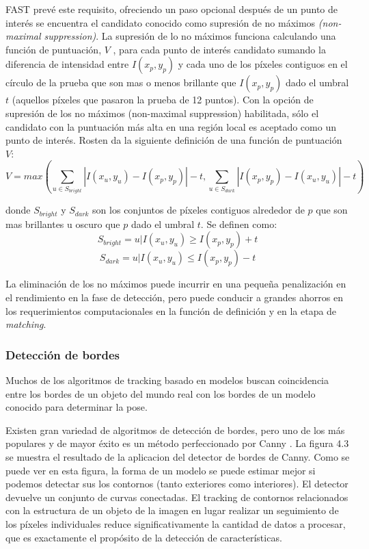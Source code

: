 FAST prevé este requisito, ofreciendo un paso opcional después de un punto de interés se encuentra el candidato conocido como supresión de no máximos \emph{(non-maximal suppression)}. La supresión de lo no máximos funciona calculando una función de puntuación, $V$ , para cada punto de interés candidato sumando la diferencia de intensidad entre $I(x_p,y_p)$ y cada uno de los píxeles contiguos en el círculo de la prueba que son mas o menos brillante que $I(x_p , y_p)$  dado el  umbral $t$  (aquellos píxeles que pasaron la prueba de 12 puntos). Con la opción de supresión de los no máximos (non-maximal suppression) habilitada, sólo el candidato con la puntuación más alta en una región local es aceptado como un punto de interés. Rosten \cite{Rosten} da la siguiente definición de una función de puntuación $V$:
\begin{equation}
  V = max\left( \displaystyle \sum_{u\in S_{bright}} \left | I(x_u,y_u) - I(x_p,y_p) \right | -t , \sum_{u\in S_{dark}} \left | I(x_p,y_p) - I(x_u,y_u) \right | -t \right) 
\end{equation}

donde $S_{bright}$ y $S_{dark}$ son los conjuntos de píxeles contiguos alrededor de $p$ que son mas brillantes u oscuro que $p$ dado el umbral $t$. Se definen como:
\begin{equation}
  S_{bright} = {{u|I(x_u , y_u ) \geq I(x_p,y_p) + t}}
\end{equation}
\begin{equation}
  S_{dark} = {{u|I(x_u , y_u) \leq I(x_p , y_p ) - t}}
\end{equation}

La eliminación de los no máximos  puede incurrir en una pequeña penalización en el rendimiento en la fase de detección, pero puede conducir a grandes ahorros en los requerimientos computacionales en la función de definición y en la etapa de \emph{matching}.

\subsubsection{Detección de bordes} 
Muchos de los algoritmos de tracking basado en modelos buscan coincidencia entre los bordes de un objeto del mundo real con los bordes de un modelo conocido para determinar la pose. 

Existen gran variedad de algoritmos de detección de bordes, pero uno de los más populares y de mayor éxito es un método perfeccionado por Canny \cite{Canny}. La figura 4.3 se muestra el resultado de la aplicacion del detector de bordes de Canny. Como se puede ver en esta figura, la forma de un modelo se puede estimar mejor si podemos detectar sus los contornos (tanto exteriores como interiores). El detector devuelve un conjunto de curvas conectadas. El tracking de contornos relacionados con la estructura de un objeto de la imagen en lugar realizar un seguimiento de los píxeles individuales reduce significativamente la cantidad de datos a procesar, que es exactamente el propósito de la detección de características. 

